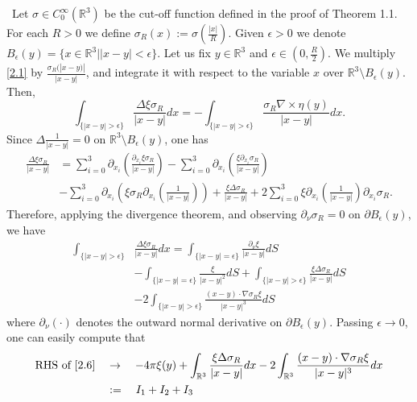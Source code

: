 \documentclass[12pt]{article}
\numberwithin{equation}{section}
\theoremstyle{definition}
\begin{document}
 \, Let  $\sigma \in C^{\infty}_{0}(\mathbb{R}^3)$  be the cut-off function defined in the proof of Theorem 1.1. For each $R>0$ we define $\sigma_{R}(x):=\sigma\left(\frac{|x|}{R}\right)$. Given $\epsilon>0$
we denote $B_{\epsilon}(y)=\{x\in\mathbb{R}^3||x-y|<\epsilon\}$. Let us fix $y\in\mathbb{R}^3$ and $\epsilon\in(0,\frac{R}{2})$.
We multiply \eqref{2.1} by $\frac{\sigma_{R}(|x-y)|}{|x-y|}$, and integrate it with respect to the variable $x$ over $\mathbb{R}^3 \setminus B_{\epsilon}(y)$.
Then,
\begin{equation}
\int_{\{|x-y|>\epsilon\}}\frac{\Delta\xi \sigma_{R}}{|x-y|} dx= -\int_{\{|x-y|>\epsilon\}} \frac{\sigma_{R}\nabla\times\eta(y)}{|x-y|}dx. \label{2.5}
\end{equation}
Since $\Delta \frac{1}{|x-y|}=0$ on $\mathbb{R}^3\setminus B_{\epsilon}(y)$, one has
\begin{align*}
\frac{\Delta\xi \sigma_{R}}{|x-y|}&=\sum^{3}_{i=0} \partial_{x_i}\left(\frac{\partial_{x_i}\xi\sigma_{R}}{|x-y|}\right)-
\sum^{3}_{i=0} \partial_{x_i}\left(\frac{\xi\partial_{x_i}\sigma_{R}}{|x-y|}\right)\\
&-\sum^{3}_{i=0}\partial_{x_i}\left(\xi\sigma_{R}\partial_{x_i}\left(\frac{1}{|x-y|}\right)\right)+\frac{\xi\Delta\sigma_{R}}{|x-y|}
+2\sum^{3}_{i=0}\xi\partial_{x_i}\left(\frac{1}{|x-y|}\right)\partial_{x_i}\sigma_{R}.
\end{align*}
Therefore, applying the divergence theorem, and observing $\partial_{\nu}\sigma_{R} = 0 $ on $\partial B_{\epsilon}(y)$,
we have
\begin{align}\label{2.6}
\int_{\{|x-y|>\epsilon\}} &\frac{\Delta\xi\sigma_{R}}{|x-y|} dx = \int_{\{|x-y|=\epsilon\}}\frac{\partial_{\nu}\xi}{|x-y|}dS\nonumber\\
&-\int_{\{|x-y|=\epsilon\}}\frac{\xi}{|x-y|^2}dS+\int_{\{|x-y|>\epsilon\}}\frac{\xi\Delta\sigma_{R}}{|x-y|}dS\nonumber\\
&-2\int_{\{|x-y|>\epsilon\}}\frac{(x-y)\cdot\nabla \sigma_{R} \xi}{|x-y|^3}dS
\end{align}
where $\partial_{\nu}(\cdot)$ denotes the outward normal derivative on $\partial B_{\epsilon}(y)$. Passing $\epsilon\rightarrow0$,
one can easily compute that
\begin{align}\label{2.7}
\text{RHS of \eqref{2.6}}\quad&\rightarrow\quad -4\pi\xi(y) + \int_{\mathbb{R}^3} \frac{\xi\Delta\sigma_{R}}{|x-y|}dx
-2\int_{\mathbb{R}^3}\frac{(x-y)\cdot\nabla \sigma_{R} \xi}{|x-y|^3}dx\nonumber\\
&:= \quad I_1 + I_2 +I_3
\end{align}
\end{document}
